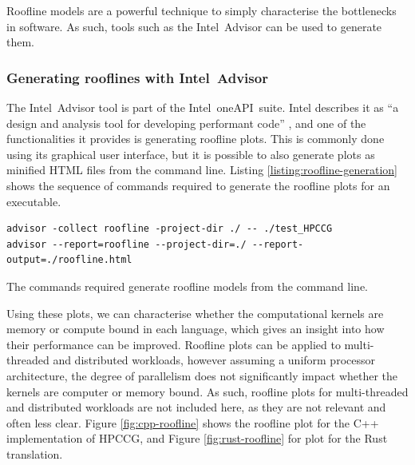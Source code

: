 Roofline models are a powerful technique to simply characterise the bottlenecks in software. As such, tools such as the Intel\textregistered\ Advisor can be used to generate them.

\subsubsection{Generating rooflines with Intel\textregistered\ Advisor}
\label{sssec:roofline-generation-intel-advisor}

The Intel\textregistered\ Advisor tool is part of the Intel\textregistered\ oneAPI\texttrademark\ suite. Intel describes it as ``a design and analysis tool for developing performant code'' \cite{DesignCodeParallelism}, and one of the functionalities it provides is generating roofline plots. This is commonly done using its graphical user interface, but it is possible to also generate plots as minified HTML files from the command line. Listing \ref{listing:roofline-generation} shows the sequence of commands required to generate the roofline plots for an executable. 

\begin{listing}[H]
    \begin{verbatim}
advisor -collect roofline -project-dir ./ -- ./test_HPCCG
advisor --report=roofline --project-dir=./ --report-output=./roofline.html
    \end{verbatim}
    \caption{The commands required generate roofline models from the command line.}
    \label{listing:roofline-generation}
\end{listing}

Using these plots, we can characterise whether the computational kernels are memory or compute bound in each language, which gives an insight into how their performance can be improved. Roofline plots can be applied to multi-threaded and distributed workloads, however assuming a uniform processor architecture, the degree of parallelism does not significantly impact whether the kernels are computer or memory bound. As such, roofline plots for multi-threaded and distributed workloads are not included here, as they are not relevant and often less clear. Figure \ref{fig:cpp-roofline} shows the roofline plot for the C++ implementation of HPCCG, and Figure \ref{fig:rust-roofline} for plot for the Rust translation.

